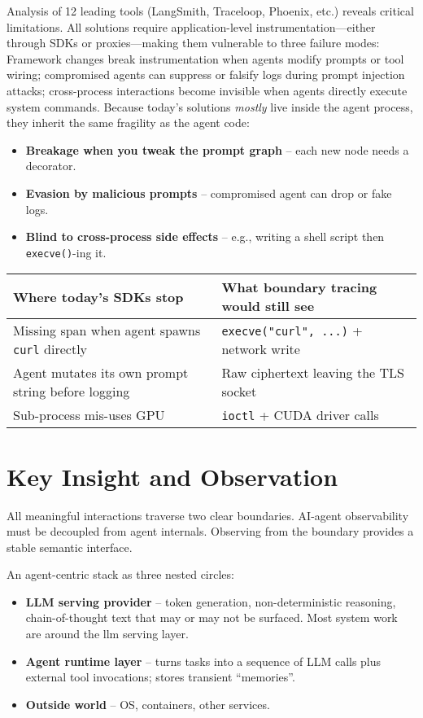 \documentclass[sigplan,screen，review,9pt]{acmart}
\begin{document}
Analysis of 12 leading tools (LangSmith, Traceloop, Phoenix, etc.) reveals critical limitations. All solutions require application-level instrumentation—either through SDKs or proxies—making them vulnerable to three failure modes: Framework changes break instrumentation when agents modify prompts or tool wiring; compromised agents can suppress or falsify logs during prompt injection attacks; cross-process interactions become invisible when agents directly execute system commands. Because today’s solutions \emph{mostly} live inside the agent process, they inherit the same fragility as the agent code:

\begin{itemize}
  \item \textbf{Breakage when you tweak the prompt graph} – each new node needs a decorator.
  \item \textbf{Evasion by malicious prompts} – compromised agent can drop or fake logs.
  \item \textbf{Blind to cross-process side effects} – e.g., writing a shell script then \verb|execve()|-ing it.
\end{itemize}


\begin{table}[h]
\centering
\small
\begin{tabular}{p{} p{}}
\toprule
\textbf{Where today's SDKs stop} & \textbf{What boundary tracing would still see} \\
\midrule
Missing span when agent spawns \texttt{curl} directly & \texttt{execve("curl", ...)} + network write \\
Agent mutates its own prompt string before logging & Raw ciphertext leaving the TLS socket \\
Sub-process mis-uses GPU & \texttt{ioctl} + CUDA driver calls \\
\bottomrule
\end{tabular}
\end{table}

\section{Key Insight and Observation}

All meaningful interactions traverse two clear boundaries.   AI-agent observability must be decoupled from agent internals.
  Observing from the boundary provides a stable semantic interface.

An agent-centric stack as three nested circles:
\begin{itemize}
  \item \textbf{LLM serving provider} – token generation, non-deterministic reasoning, chain-of-thought text that may or may not be surfaced. Most system work are around the llm serving layer.
  \item \textbf{Agent runtime layer} – turns tasks into a sequence of LLM calls plus external tool invocations; stores transient ``memories''.
  \item \textbf{Outside world} – OS, containers, other services.
\end{itemize}
\end{document}
